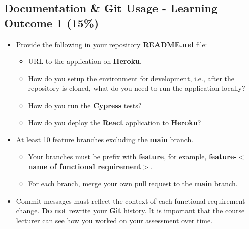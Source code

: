 \documentclass{article}
\begin{document}
\subsection*{Documentation \& Git Usage - Learning Outcome 1 (15\%)}
\begin{itemize}
    \item Provide the following in your repository \textbf{README.md} file:
          \begin{itemize}
              \item URL to the application on \textbf{Heroku}.
              \item How do you setup the environment for development, i.e., after the repository is cloned, what do you need to run the application locally?
              \item How do you run the \textbf{Cypress} tests?
              \item How do you deploy the \textbf{React} application to \textbf{Heroku}?
          \end{itemize}
            \end{itemize}
        \begin{itemize}
    \item At least 10 feature branches excluding the \textbf{main} branch.
    \begin{itemize}
            \item Your branches must be prefix with \textbf{feature}, for example, \textbf{feature-$<$name of functional requirement$>$}.
            \item For each branch, merge your own pull request to the \textbf{main} branch.
    \end{itemize}
    \item Commit messages must reflect the context of each functional requirement change. \textbf{Do not} rewrite your \textbf{Git} history. It is important that the course lecturer can see how you worked on your assessment over time.
\end{itemize}
\end{document}
